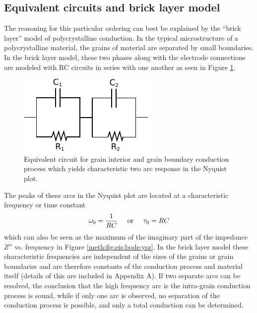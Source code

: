 \vspace{12pt}
\subsection{Equivalent circuits and brick layer model}
The reasoning for this particular ordering can best be explained by the ``brick layer'' model of polycrystalline conduction. In the typical microstructure of a polycrystalline material, the grains of material are separated by small boundaries. In the brick layer model, these two phases along with the electrode connections are modeled with RC circuits in series with one another as seen in Figure \ref{fig:meth:RCRCmodel}. 
\begin{figure}
    \centering
    \includegraphics[width=.5\linewidth]{Figures/seriesLayerModel.pdf}
    \caption{Equivalent circuit for grain interior and grain boundary conduction process which yields characteristic two arc response in the Nyquist plot.}
    \label{fig:meth:RCRCmodel}
\end{figure}
The peaks of these arcs in the Nyquist plot are located at a characteristic frequency or time constant \begin{equation}
	\omega_0 = \frac{1}{RC} \hspace{.5cm} \mathrm{or} \hspace{.5cm} \tau_0 = RC
	\label{eq:meth:timeConstant}
\end{equation} which can also be seen as the maximum of the imaginary part of the impedance $Z''$ vs. frequency in Figure \ref{meth:fig:eis:bode:ysz}. In the brick layer model these characteristic frequencies are independent of the sizes of the grains or grain boundaries and are therefore constants of the conduction process and material itself (details of this are included in Appendix A). If two separate arcs can be resolved, the conclusion that the high frequency arc is the intra-grain conduction process is sound, while if only one arc is observed, no separation of the conduction process is possible, and only a total conduction can be determined.
